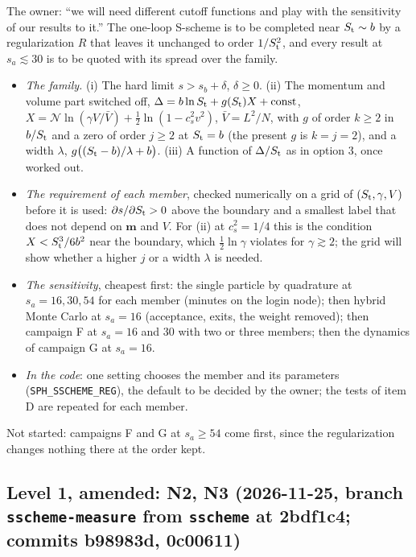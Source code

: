 \documentclass[11pt,aps,preprint,nofootinbib,superscriptaddress,tightenlines]{revtex4-2}
\begin{document}
The owner: ``we will need different cutoff functions and play with the sensitivity of our results to it.''  The one-loop S-scheme is to be completed
near $S_{\rm t}\sim b$ by a regularization $R$ that leaves it unchanged to order $1/S_{\rm t}^2$, and every result at $s_a\lesssim30$ is to be quoted with
its spread over the family.
\begin{itemize}
\item \emph{The family.}  (i) The hard limit $s>s_b+\delta$, $\delta\ge0$.  (ii) The momentum and volume part switched off,
  $\Delta=b\ln S_{\rm t}+g(S_{\rm t})X+\text{const}$, $X=\mathcal N\ln(\gamma V/\bar V)+\tfrac12\ln(1-c_s^2v^2)$, $\bar V=L^2/N$, with $g$ of order $k\ge2$ in
  $b/S_{\rm t}$ and a zero of order $j\ge2$ at $S_{\rm t}=b$ (the present $g$ is $k=j=2$), and a width $\lambda$, $g\big((S_{\rm t}-b)/\lambda+b\big)$.
  (iii) A function of $\Delta/S_{\rm t}$ as in option 3, once worked out.
\item \emph{The requirement of each member}, checked numerically on a grid of $(S_{\rm t},\gamma,V)$ before it is used: $\partial s/\partial S_{\rm t}>0$
  above the boundary and a smallest label that does not depend on $\bm m$ and $V$.  For (ii) at $c_s^2=1/4$ this is the condition
  $X<S_{\rm t}^3/6b^2$ near the boundary, which $\tfrac12\ln\gamma$ violates for $\gamma\gtrsim2$; the grid will show whether a higher $j$ or a width
  $\lambda$ is needed.
\item \emph{The sensitivity}, cheapest first: the single particle by quadrature at $s_a=16,30,54$ for each member (minutes on the login node);
  then hybrid Monte Carlo at $s_a=16$ (acceptance, exits, the weight removed); then campaign F at $s_a=16$ and $30$ with two or three members; then
  the dynamics of campaign G at $s_a=16$.
\item \emph{In the code}: one setting chooses the member and its parameters (\texttt{SPH\_SSCHEME\_REG}), the default to be decided by the owner; the
  tests of item D are repeated for each member.
\end{itemize}
Not started: campaigns F and G at $s_a\ge54$ come first, since the regularization changes nothing there at the order kept.

\subsection*{Level 1, amended: N2, N3 (2026-11-25, branch \texttt{sscheme-measure} from \texttt{sscheme} at 2bdf1c4; commits b98983d, 0c00611)}
\end{document}
